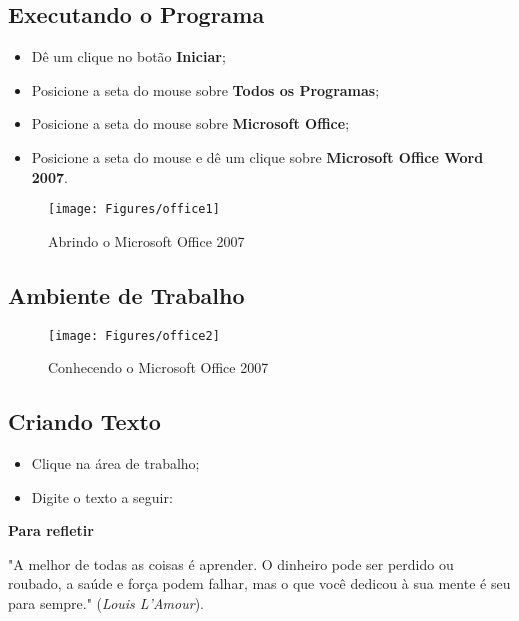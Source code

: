 \documentclass[12pt]{article}
\begin{document}
	\subsection{Executando o Programa}
	
	\begin{itemize}
		\item Dê um clique no botão \textbf {Iniciar};

		\item Posicione a seta do mouse sobre \textbf{Todos os Programas};
		
		\item Posicione a seta do mouse sobre \textbf{Microsoft Office};
		
		\item Posicione a seta do mouse e dê um clique sobre \textbf{Microsoft Office Word 2007}.
		
		
	\end{itemize}
	
	\begin{figure}[!h]
		\centering
		\texttt{[image: Figures/office1]}
		\label{fig:office1}
		\caption{Abrindo o Microsoft Office 2007}
	\end{figure}
			
	\newpage		
	\subsection{Ambiente de Trabalho}
		
		\begin{figure}[!h]
			\centering
			\texttt{[image: Figures/office2]}
			\label{fig:office2}
			\caption{Conhecendo o Microsoft Office 2007}
		\end{figure}
				
	\subsection{Criando Texto}

		
		\begin{itemize}
			\item Clique na área de trabalho;
			
			\item Digite o texto a seguir:
		\end{itemize}
		
		
		{\textbf{\hspace{5cm} Para refletir}}
		
		"A melhor de todas as coisas é aprender. O dinheiro pode ser perdido ou roubado, a saúde e força podem falhar, mas o que você dedicou à sua mente é seu para sempre." (\emph{Louis L'Amour}).
		
\end{document}
